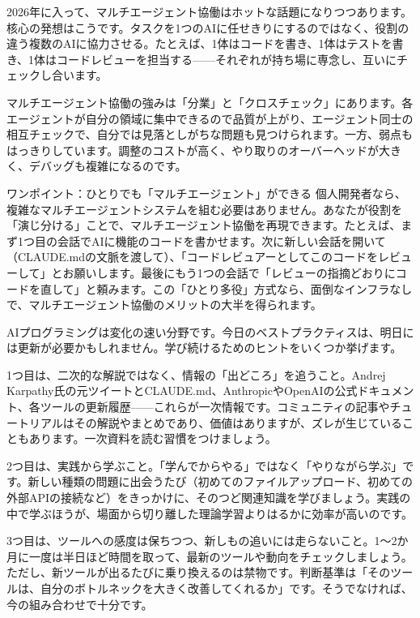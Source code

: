 
2026年に入って、マルチエージェント協働はホットな話題になりつつあります。核心の発想はこうです。タスクを1つのAIに任せきりにするのではなく、役割の違う複数のAIに協力させる。たとえば、1体はコードを書き、1体はテストを書き、1体はコードレビューを担当する——それぞれが持ち場に専念し、互いにチェックし合います。

マルチエージェント協働の強みは「分業」と「クロスチェック」にあります。各エージェントが自分の領域に集中できるので品質が上がり、エージェント同士の相互チェックで、自分では見落としがちな問題も見つけられます。一方、弱点もはっきりしています。調整のコストが高く、やり取りのオーバーヘッドが大きく、デバッグも複雑になるのです。

\begin{tcbinfo}{ワンポイント：ひとりでも「マルチエージェント」ができる}
個人開発者なら、複雑なマルチエージェントシステムを組む必要はありません。あなたが役割を「演じ分ける」ことで、マルチエージェント協働を再現できます。たとえば、まず1つ目の会話でAIに機能のコードを書かせます。次に新しい会話を開いて（CLAUDE.mdの文脈を渡して）、「コードレビュアーとしてこのコードをレビューして」とお願いします。最後にもう1つの会話で「レビューの指摘どおりにコードを直して」と頼みます。この「ひとり多役」方式なら、面倒なインフラなしで、マルチエージェント協働のメリットの大半を得られます。

\end{tcbinfo}


AIプログラミングは変化の速い分野です。今日のベストプラクティスは、明日には更新が必要かもしれません。学び続けるためのヒントをいくつか挙げます。

1つ目は、二次的な解説ではなく、情報の「出どころ」を追うこと。Andrej Karpathy氏の元ツイートとCLAUDE.md、AnthropicやOpenAIの公式ドキュメント、各ツールの更新履歴——これらが一次情報です。コミュニティの記事やチュートリアルはその解説やまとめであり、価値はありますが、ズレが生じていることもあります。一次資料を読む習慣をつけましょう。

2つ目は、実践から学ぶこと。「学んでからやる」ではなく「やりながら学ぶ」です。新しい種類の問題に出会うたび（初めてのファイルアップロード、初めての外部APIの接続など）をきっかけに、そのつど関連知識を学びましょう。実践の中で学ぶほうが、場面から切り離した理論学習よりはるかに効率が高いのです。

3つ目は、ツールへの感度は保ちつつ、新しもの追いには走らないこと。1〜2か月に一度は半日ほど時間を取って、最新のツールや動向をチェックしましょう。ただし、新ツールが出るたびに乗り換えるのは禁物です。判断基準は「そのツールは、自分のボトルネックを大きく改善してくれるか」です。そうでなければ、今の組み合わせで十分です。

